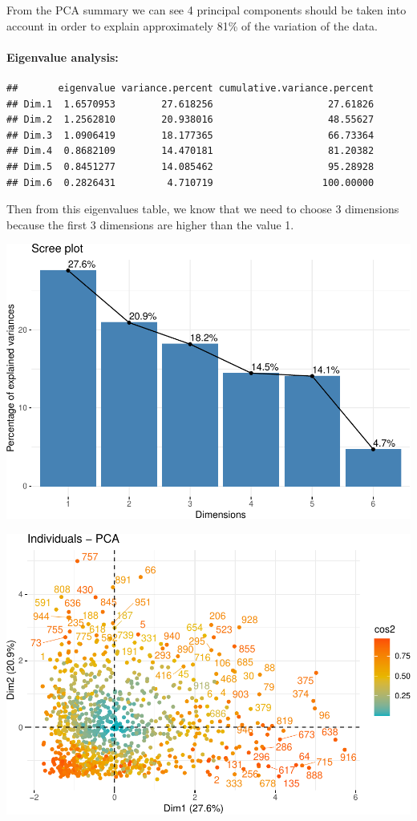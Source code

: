 \documentclass[
]{article}
\begin{document}
From the PCA summary we can see 4 principal components should be taken
into account in order to explain approximately 81\% of the variation of
the data.

\hypertarget{eigenvalue-analysis}{%
\paragraph{Eigenvalue analysis:}\label{eigenvalue-analysis}}

\begin{verbatim}
##       eigenvalue variance.percent cumulative.variance.percent
## Dim.1  1.6570953        27.618256                    27.61826
## Dim.2  1.2562810        20.938016                    48.55627
## Dim.3  1.0906419        18.177365                    66.73364
## Dim.4  0.8682109        14.470181                    81.20382
## Dim.5  0.8451277        14.085462                    95.28928
## Dim.6  0.2826431         4.710719                   100.00000
\end{verbatim}

Then from this eigenvalues table, we know that we need to choose 3
dimensions because the first 3 dimensions are higher than the value 1.

\begin{center}\includegraphics[width=1\linewidth]{report_files/figure-latex/unnamed-chunk-17-1} \end{center}

\includegraphics{report_files/figure-latex/unnamed-chunk-18-1.pdf}
\end{document}

